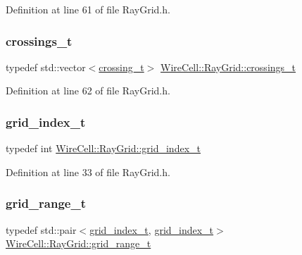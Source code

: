 Definition at line 61 of file Ray\+Grid.\+h.

\mbox{\label{namespace_wire_cell_1_1_ray_grid_a100185dcaa66f6b2b42c53c40c37fb49}} 
\subsubsection{\texorpdfstring{crossings\+\_\+t}{crossings\_t}}
{\footnotesize\ttfamily typedef std\+::vector$<$\hyperlink{namespace_wire_cell_1_1_ray_grid_ad8870c962588c4492b1f7c5ad1552a7e}{crossing\+\_\+t}$>$ \hyperlink{namespace_wire_cell_1_1_ray_grid_a100185dcaa66f6b2b42c53c40c37fb49}{Wire\+Cell\+::\+Ray\+Grid\+::crossings\+\_\+t}}



Definition at line 62 of file Ray\+Grid.\+h.

\mbox{\label{namespace_wire_cell_1_1_ray_grid_ae97b5b26d015cd99f7d4566f3a7310d0}} 
\subsubsection{\texorpdfstring{grid\+\_\+index\+\_\+t}{grid\_index\_t}}
{\footnotesize\ttfamily typedef int \hyperlink{namespace_wire_cell_1_1_ray_grid_ae97b5b26d015cd99f7d4566f3a7310d0}{Wire\+Cell\+::\+Ray\+Grid\+::grid\+\_\+index\+\_\+t}}



Definition at line 33 of file Ray\+Grid.\+h.

\mbox{\label{namespace_wire_cell_1_1_ray_grid_a4f0a195ceaa41bf0c9d13f0c81309633}} 
\subsubsection{\texorpdfstring{grid\+\_\+range\+\_\+t}{grid\_range\_t}}
{\footnotesize\ttfamily typedef std\+::pair$<$\hyperlink{namespace_wire_cell_1_1_ray_grid_ae97b5b26d015cd99f7d4566f3a7310d0}{grid\+\_\+index\+\_\+t}, \hyperlink{namespace_wire_cell_1_1_ray_grid_ae97b5b26d015cd99f7d4566f3a7310d0}{grid\+\_\+index\+\_\+t}$>$ \hyperlink{namespace_wire_cell_1_1_ray_grid_a4f0a195ceaa41bf0c9d13f0c81309633}{Wire\+Cell\+::\+Ray\+Grid\+::grid\+\_\+range\+\_\+t}}




